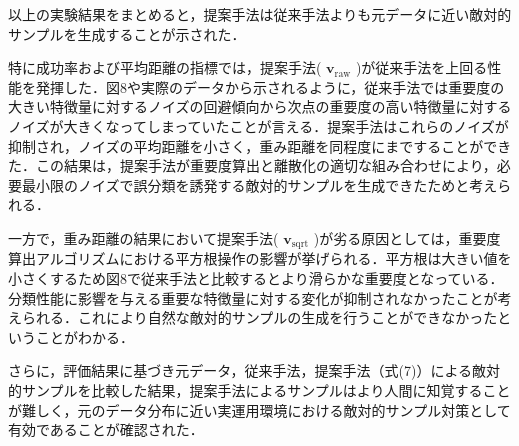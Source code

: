 以上の実験結果をまとめると，提案手法は従来手法よりも元データに近い敵対的サンプルを生成することが示された．

特に成功率および平均距離の指標では，提案手法( $\bm{v}_{\mathrm{raw}}$ )が従来手法を上回る性能を発揮した．図8や実際のデータから示されるように，従来手法では重要度の大きい特徴量に対するノイズの回避傾向から次点の重要度の高い特徴量に対するノイズが大きくなってしまっていたことが言える．提案手法はこれらのノイズが抑制され，ノイズの平均距離を小さく，重み距離を同程度にまですることができた．この結果は，提案手法が重要度算出と離散化の適切な組み合わせにより，必要最小限のノイズで誤分類を誘発する敵対的サンプルを生成できたためと考えられる．

一方で，重み距離の結果において提案手法( $\bm{v}_{\mathrm{sqrt}}$ )が劣る原因としては，重要度算出アルゴリズムにおける平方根操作の影響が挙げられる．平方根は大きい値を小さくするため図8で従来手法と比較するとより滑らかな重要度となっている．分類性能に影響を与える重要な特徴量に対する変化が抑制されなかったことが考えられる．これにより自然な敵対的サンプルの生成を行うことができなかったということがわかる．

さらに，評価結果に基づき元データ，従来手法，提案手法（式(7)）による敵対的サンプルを比較した結果，提案手法によるサンプルはより人間に知覚することが難しく，元のデータ分布に近い実運用環境における敵対的サンプル対策として有効であることが確認された．